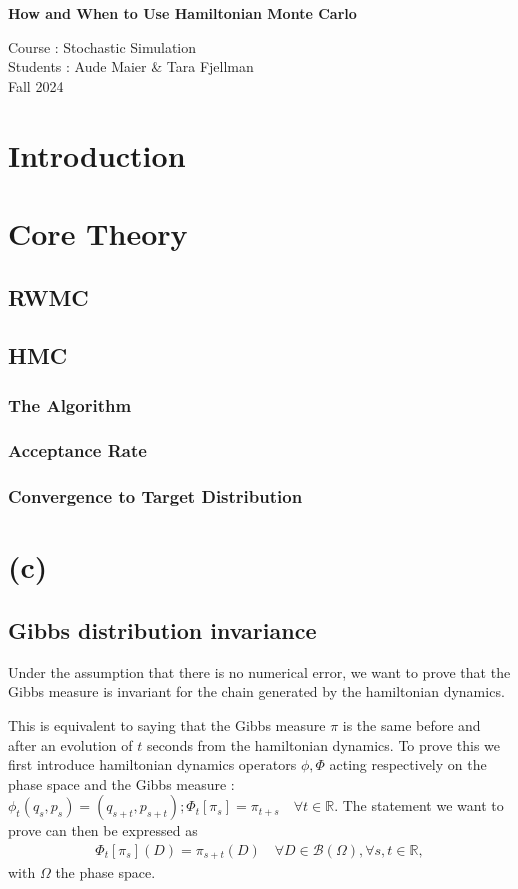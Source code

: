 \documentclass[a4paper, 12pt,oneside]{article}
\begin{document}
 
	\begin{center}
	    \Large
	    \textbf{How and When to Use Hamiltonian Monte Carlo} 
	    \vspace{0.4cm}
	    \large

		Course : Stochastic Simulation \\
	    Students : Aude Maier \& Tara Fjellman \\
	    \small{Fall 2024}
	\end{center}

	\section{Introduction}
	\section{Core Theory}
		\subsection{RWMC}
		\subsection{HMC}
			\subsubsection{The Algorithm}
			\subsubsection{Acceptance Rate}
			\subsubsection{Convergence to Target Distribution}
	\section{(c)}
        \subsection{Gibbs distribution invariance}
		Under the assumption that there is no numerical error, we want to prove that the Gibbs measure is invariant for the chain generated by the hamiltonian dynamics.

		This is equivalent to saying that the Gibbs measure $\pi$ is the same before and after an evolution of $t$ seconds from the hamiltonian dynamics. 
		To prove this we first introduce hamiltonian dynamics operators $\phi,\Phi$ acting respectively on the phase space and the Gibbs measure : $\phi_t(q_s,p_s)=(q_{s+t},p_{s+t});\Phi_t[\pi_s]=\pi_{t+s}\quad \forall t\in\mathbb{R}$.
		The statement we want to prove can then be expressed as 
		\begin{gather}
			\Phi_t[\pi_s](D)=\pi_{s+t}(D)\quad \forall D\in\mathcal{B}(\Omega),\forall s,t\in\mathbb{R},
		\end{gather}
		with $\Omega$ the phase space.
\end{document}
